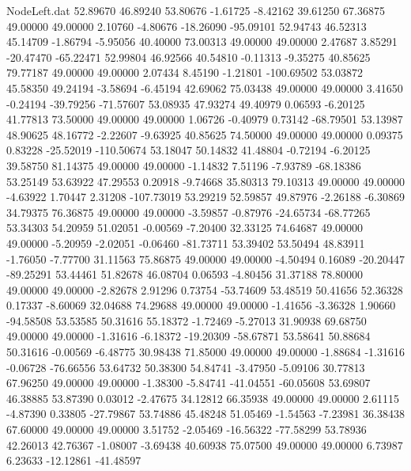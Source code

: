 \begin{filecontents}{NodeLeft.dat}
  52.89670   46.89240   53.80676    -1.61725   -8.42162   39.61250   67.36875   49.00000   49.00000    2.10760   -4.80676  -18.26090  -95.09101
  52.94743   46.52313   45.14709    -1.86794   -5.95056   40.40000   73.00313   49.00000   49.00000    2.47687    3.85291  -20.47470  -65.22471
  52.99804   46.92566   40.54810    -0.11313   -9.35275   40.85625   79.77187   49.00000   49.00000    2.07434    8.45190   -1.21801 -100.69502
  53.03872   45.58350   49.24194    -3.58694   -6.45194   42.69062   75.03438   49.00000   49.00000    3.41650   -0.24194  -39.79256  -71.57607
  53.08935   47.93274   49.40979     0.06593   -6.20125   41.77813   73.50000   49.00000   49.00000    1.06726   -0.40979    0.73142  -68.79501
  53.13987   48.90625   48.16772    -2.22607   -9.63925   40.85625   74.50000   49.00000   49.00000    0.09375    0.83228  -25.52019 -110.50674
  53.18047   50.14832   41.48804    -0.72194   -6.20125   39.58750   81.14375   49.00000   49.00000   -1.14832    7.51196   -7.93789  -68.18386
  53.25149   53.63922   47.29553     0.20918   -9.74668   35.80313   79.10313   49.00000   49.00000   -4.63922    1.70447    2.31208 -107.73019
  53.29219   52.59857   49.87976    -2.26188   -6.30869   34.79375   76.36875   49.00000   49.00000   -3.59857   -0.87976  -24.65734  -68.77265
  53.34303   54.20959   51.02051    -0.00569   -7.20400   32.33125   74.64687   49.00000   49.00000   -5.20959   -2.02051   -0.06460  -81.73711
  53.39402   53.50494   48.83911    -1.76050   -7.77700   31.11563   75.86875   49.00000   49.00000   -4.50494    0.16089  -20.20447  -89.25291
  53.44461   51.82678   46.08704     0.06593   -4.80456   31.37188   78.80000   49.00000   49.00000   -2.82678    2.91296    0.73754  -53.74609
  53.48519   50.41656   52.36328     0.17337   -8.60069   32.04688   74.29688   49.00000   49.00000   -1.41656   -3.36328    1.90660  -94.58508
  53.53585   50.31616   55.18372    -1.72469   -5.27013   31.90938   69.68750   49.00000   49.00000   -1.31616   -6.18372  -19.20309  -58.67871
  53.58641   50.88684   50.31616    -0.00569   -6.48775   30.98438   71.85000   49.00000   49.00000   -1.88684   -1.31616   -0.06728  -76.66556
  53.64732   50.38300   54.84741    -3.47950   -5.09106   30.77813   67.96250   49.00000   49.00000   -1.38300   -5.84741  -41.04551  -60.05608
  53.69807   46.38885   53.87390     0.03012   -2.47675   34.12812   66.35938   49.00000   49.00000    2.61115   -4.87390    0.33805  -27.79867
  53.74886   45.48248   51.05469    -1.54563   -7.23981   36.38438   67.60000   49.00000   49.00000    3.51752   -2.05469  -16.56322  -77.58299
  53.78936   42.26013   42.76367    -1.08007   -3.69438   40.60938   75.07500   49.00000   49.00000    6.73987    6.23633  -12.12861  -41.48597

\end{filecontents}
